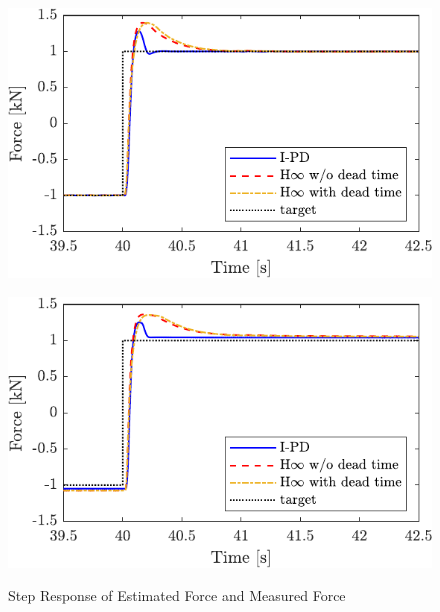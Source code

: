 \begin{figure}[t]
    \begin{minipage}{\minipageratio\hsize}
    \centering
        \includegraphics[keepaspectratio, scale = \minifigscale]{contents/ForceControl/figure/1115/crop-1115_diff_estforce_step.pdf}
        \label{fig4:crop-1115_diff_estforce_step}
    \end{minipage} 
    \begin{minipage}{\minipageratio\hsize}
    \centering
        \includegraphics[keepaspectratio, scale = \minifigscale]{contents/ForceControl/figure/1115/crop-1115_diff_force_step.pdf}
        \label{fig4:crop-1115_diff_force_step}
    \end{minipage}
    \caption{Step Response of Estimated Force and Measured Force}
    \label{fig4:crop-1115_diff_step}
\end{figure}
